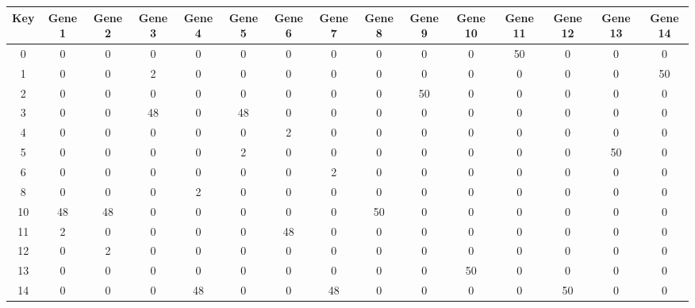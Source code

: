\begin{tabular}{|c|c|c|c|c|c|c|c|c|c|c|c|c|c|c|}
\hline
Key & Gene 1 & Gene 2 & Gene 3 & Gene 4 & Gene 5 & Gene 6 & Gene 7 & Gene 8 & Gene 9 & Gene 10 & Gene 11 & Gene 12 & Gene 13 & Gene 14 \\
\hline
0 & 0 & 0 & 0 & 0 & 0 & 0 & 0 & 0 & 0 & 0 & 50 & 0 & 0 & 0 \\
1 & 0 & 0 & 2 & 0 & 0 & 0 & 0 & 0 & 0 & 0 & 0 & 0 & 0 & 50 \\
2 & 0 & 0 & 0 & 0 & 0 & 0 & 0 & 0 & 50 & 0 & 0 & 0 & 0 & 0 \\
3 & 0 & 0 & 48 & 0 & 48 & 0 & 0 & 0 & 0 & 0 & 0 & 0 & 0 & 0 \\
4 & 0 & 0 & 0 & 0 & 0 & 2 & 0 & 0 & 0 & 0 & 0 & 0 & 0 & 0 \\
5 & 0 & 0 & 0 & 0 & 2 & 0 & 0 & 0 & 0 & 0 & 0 & 0 & 50 & 0 \\
6 & 0 & 0 & 0 & 0 & 0 & 0 & 2 & 0 & 0 & 0 & 0 & 0 & 0 & 0 \\
8 & 0 & 0 & 0 & 2 & 0 & 0 & 0 & 0 & 0 & 0 & 0 & 0 & 0 & 0 \\
10 & 48 & 48 & 0 & 0 & 0 & 0 & 0 & 50 & 0 & 0 & 0 & 0 & 0 & 0 \\
11 & 2 & 0 & 0 & 0 & 0 & 48 & 0 & 0 & 0 & 0 & 0 & 0 & 0 & 0 \\
12 & 0 & 2 & 0 & 0 & 0 & 0 & 0 & 0 & 0 & 0 & 0 & 0 & 0 & 0 \\
13 & 0 & 0 & 0 & 0 & 0 & 0 & 0 & 0 & 0 & 50 & 0 & 0 & 0 & 0 \\
14 & 0 & 0 & 0 & 48 & 0 & 0 & 48 & 0 & 0 & 0 & 0 & 50 & 0 & 0 \\
\hline
\end{tabular}